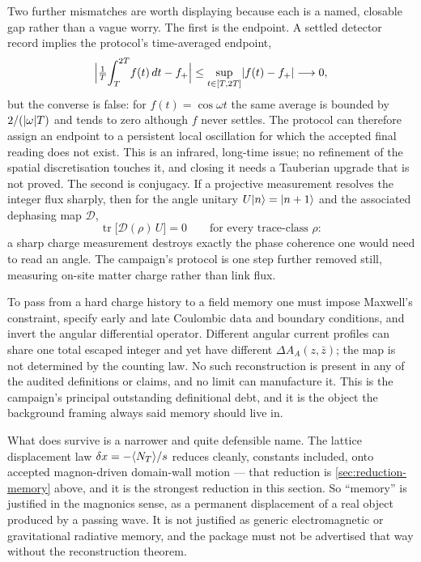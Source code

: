 Two further mismatches are worth displaying because each is a named, closable
gap rather than a vague worry. The first is the endpoint. A settled detector
record implies the protocol's time-averaged endpoint,
\begin{equation}
  \Bigl|\tfrac1T\!\int_T^{2T}\!f(t)\,dt-f_+\Bigr|
  \le\sup_{t\in[T,2T]}\lvert f(t)-f_+\rvert\longrightarrow0,
  \label{eq:da-cesaro-forward}
\end{equation}
but the converse is false: for $f(t)=\cos\omega t$ the same average is bounded
by $2/(\lvert \omega\rvert T)$ and tends to zero although $f$ never settles. The
protocol can therefore assign an endpoint to a persistent local oscillation for
which the accepted final reading does not exist. This is an infrared, long-time
issue; no refinement of the spatial discretisation touches it, and closing it
needs a Tauberian upgrade that is not proved. The second is conjugacy. If a
projective measurement resolves the integer flux sharply, then for the angle
unitary $U|n\rangle=|n+1\rangle$ and the associated dephasing map $\mathcal D$,
\begin{equation}
  \operatorname{tr}\bigl[\mathcal D(\rho)\,U\bigr]=0
  \qquad\text{for every trace-class }\rho:
  \label{eq:da-conjugate-kill}
\end{equation}
a sharp charge measurement destroys exactly the phase coherence one would need
to read an angle. The campaign's protocol is one step further removed still,
measuring on-site matter charge rather than link flux.

\begin{observation}
\label{obs:da-memory-name}
To pass from a hard charge history to a field memory one must impose Maxwell's
constraint, specify early and late Coulombic data and boundary conditions, and
invert the angular differential operator. Different angular current profiles
can share one total escaped integer and yet have different
$\Delta A_A(z,\bar z)$; the map is not determined by the counting law. No such
reconstruction is present in any of the audited definitions or claims, and no
limit can manufacture it. This is the campaign's principal outstanding
definitional debt, and it is the object the background framing always said
memory should live in.

What does survive is a narrower and quite defensible name. The lattice
displacement law $\delta x=-\langle N_T\rangle/s$ reduces cleanly, constants
included, onto accepted magnon-driven domain-wall motion --- that reduction is
\cref{sec:reduction-memory} above, and it is the strongest reduction in this
section. So ``memory'' is justified in the magnonics sense, as a permanent
displacement of a real object produced by a passing wave. It is not justified
as generic electromagnetic or gravitational radiative memory, and the package
must not be advertised that way without the reconstruction theorem.
\end{observation}

